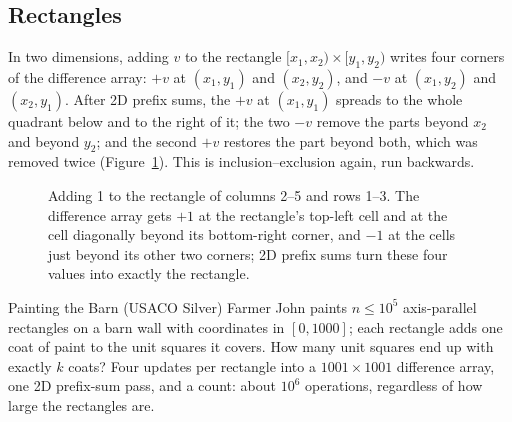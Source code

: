 
\subsection{Rectangles}

In two dimensions, adding $v$ to the rectangle $[x_1, x_2) \times [y_1, y_2)$ writes four corners of the difference array:
$+v$ at $(x_1, y_1)$ and $(x_2, y_2)$, and $-v$ at $(x_1, y_2)$ and $(x_2, y_1)$. After 2D prefix sums, the $+v$ at
$(x_1, y_1)$ spreads to the whole quadrant below and to the right of it; the two $-v$ remove the parts beyond $x_2$ and
beyond $y_2$; and the second $+v$ restores the part beyond both, which was removed twice (Figure~\ref{fig:diff2d}). This is
inclusion--exclusion again, run backwards.

\begin{figure}[htbp]
\centering
{}
\caption{Adding 1 to the rectangle of columns 2--5 and rows 1--3. The difference array gets $+1$ at the rectangle's top-left
cell and at the cell diagonally beyond its bottom-right corner, and $-1$ at the cells just beyond its other two corners; 2D
prefix sums turn these four values into exactly the rectangle.}
\label{fig:diff2d}
\end{figure}

\begin{problem}{Painting the Barn (USACO Silver)}
Farmer John paints $n \le 10^5$ axis-parallel rectangles on a barn wall with coordinates in $[0, 1000]$; each rectangle adds
one coat of paint to the unit squares it covers. How many unit squares end up with exactly $k$ coats?
\solution Four updates per rectangle into a $1001 \times 1001$ difference array, one 2D prefix-sum pass, and a count: about
$10^6$ operations, regardless of how large the rectangles are.
\end{problem}

